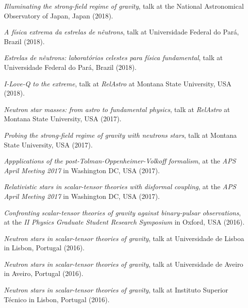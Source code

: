 \documentclass[10pt]{article}
\newcommand{\invited}{{\color{aeilbl}{invited}}}
\begin{document}
\begin{bibenum}
	\item
    \emph{Illuminating the strong-field regime of gravity},
    \invited{} talk at the National Astronomical Observatory of Japan, Japan (2018).

    \item
    \emph{A f\'isica extrema da estrelas de n\^eutrons},
    \invited{} talk at Universidade Federal do Par\'a, Brazil (2018).

    \item
    \emph{Estrelas de n\^eutrons: laborat\'orios celestes para f\'isica fundamental},
    \invited{} talk at Universidade Federal do Par\'a, Brazil (2018).

    \item
    \emph{I-Love-Q to the extreme},
    talk at \emph{RelAstro} at Montana State University, USA (2018).

    \item
    \emph{Neutron star masses: from astro to fundamental physics},
    talk at \emph{RelAstro} at Montana State University, USA (2017).

    \item
    \emph{Probing the strong-field regime of gravity with neutrons stars},
    \invited{} talk at Montana State University, USA (2017).

    \item
    \emph{Appplications of the post-Tolman-Oppenheimer-Volkoff formalism},
    at the \emph{APS April Meeting 2017}
    in Washington DC, USA (2017).

    \item
    \emph{Relativistic stars in scalar-tensor theories with disformal coupling},
    at the \emph{APS April Meeting 2017}
    in Washington DC, USA (2017).

    \item
    \emph{Confronting scalar-tensor theories of gravity
    against binary-pulsar observations},
    at the \emph{II Physics Graduate Student Research Symposium}
    in Oxford, USA (2016).

    \item
    \emph{Neutron stars in scalar-tensor theories of gravity},
    \invited{} talk at Universidade de Lisboa
    in Lisbon, Portugal (2016).

    \item
    \emph{Neutron stars in scalar-tensor theories of gravity},
    \invited{} talk at Universidade de Aveiro
    in Aveiro, Portugal (2016).

    \item
    \emph{Neutron stars in scalar-tensor theories of gravity},
    \invited{} talk at Instituto Superior T\'ecnico
    in Lisbon, Portugal (2016).


\end{bibenum}
\end{document}
